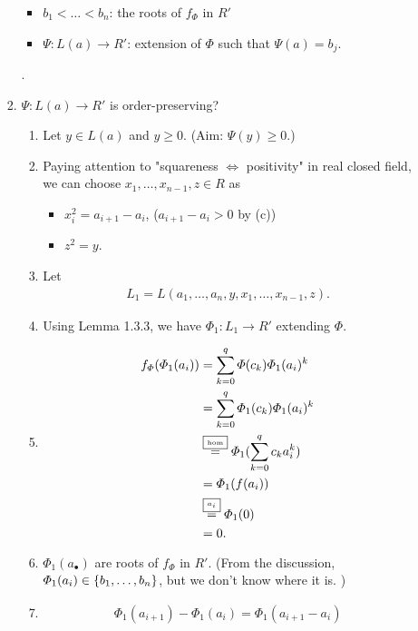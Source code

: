 \documentclass[9pt]{ltjsarticle}
\begin{document}
\begin{itemize}
\begin{enumerate}
\begin{enumerate}
\begin{itemize}
        \item $b_1 < \dots < b_n$: the roots of $f_\varPhi$ in $R'$
        \item $\Psi\colon L(a)\to R'$: extension of $\varPhi$ such that $\Psi(a) = b_j$.
      \end{itemize}
      .
      \item
      $\Psi\colon L(a) \to R'$ is order-preserving?
      \begin{enumerate}
        \item Let $y\in L(a)$ and $y \ge 0$.  (Aim: $\Psi(y) \ge 0$.)
        \item
        Paying attention to "squareness $\iff$ positivity" in real closed field,
        we can choose $x_1,\dots,x_{n-1},z \in R$ as
        \begin{itemize}
          \item $x_i^2 = a_{i+1} - a_i$,  ($a_{i+1}-a_i > 0$ by (c))
          \item $z^2 = y$.
        \end{itemize}
        \item
        Let
        \begin{align}
          L_1 = L(a_1,\dots,a_n,y,x_1,\dots,x_{n-1},z).
        \end{align}
        \item
        Using Lemma 1.3.3, we have $\varPhi_1 \colon L_1 \to R'$ extending $\varPhi$.
        \item
        \begin{align}
          f_\varPhi(\varPhi_1(a_i)) &=
          \sum_{k=0}^q \varPhi(c_k)\varPhi_1(a_i)^k\\
          &=
          \sum_{k=0}^q \varPhi_1(c_k)\varPhi_1(a_i)^k\\
          &\overset{\text{\fbox{\tiny hom}}}{=}
          \varPhi_1(\sum_{k=0}^q c_k a_i^k)\\
          &=
          \varPhi_1(f(a_i))\\
          &\overset{\text{\fbox{\tiny $a_i$}}}{=}
          \varPhi_1(0)\\
          &=
          0.
        \end{align}
        \item
        $\varPhi_1(a_\bullet) $ are roots of $f_\varPhi$ in $R'$.
        (From the discussion, $\varPhi_1(a_i) \in \left\{b_1,\dots,b_n\right\}$, but we don't know where it is. )
        \item
        \begin{align}
          \varPhi_1(a_{i+1}) - \varPhi_1(a_i)
          =
          \varPhi_1(a_{i+1}-a_i)

\end{align}
\end{enumerate}
\end{enumerate}
\end{enumerate}
\end{itemize}
\end{document}
